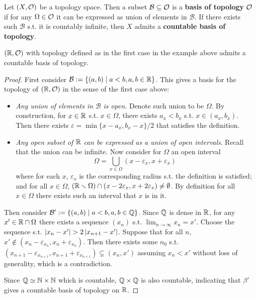 \documentclass{article}
\begin{document}
\begin{definition}
    Let $(X, \mathcal{O})$ be a topology space. Then a subset $\mathcal{B} \subseteq \mathcal{O}$ is a \textbf{basis of topology} $\mathcal{O}$ if for any $\Omega \in \mathcal{O}$ it can be expressed as union of elements in $\mathcal{B}$. If there exists such $\mathcal{B}$ s.t. it is countably infinite, then $X$ admits a \textbf{countable basis of topology}.
\end{definition}

\begin{proposition}
    $(\mathbb{R}, \mathcal{O})$ with topology defined as in the first case in the example above admits a countable basis of topology.
\end{proposition}

\begin{proof}
    First consider $\mathcal{B} := \{(a, b) \mid a < b, a, b \in \mathbb{R}\}$. This gives a basis for the topology of $(\mathbb{R}, \mathcal{O})$ in the sense of the first case above:
    \begin{itemize}
        \item \emph{Any union of elements in $\mathcal{B}$ is open.} Denote such union to be $\Omega$. By construction, for $x \in \mathbb{R}$ s.t. $x \in \Omega$, there exists $a_x < b_x$ s.t. $x \in (a_x, b_x)$. Then there exists $\varepsilon = \min\{x - a_x, b_x - x\} / 2$ that satisfies the definition.
        \item \emph{Any open subset of $\mathbb{R}$ can be expressed as a union of open intervals}. Recall that the union can be infinite. Now consider for $\Omega$ an open interval
        \[
            \Omega = \bigcup_{x \in \Omega} (x - \varepsilon_x, x + \varepsilon_x)
        \]
        where for each $x$, $\varepsilon_x$ is the corresponding radius s.t. the definition is satisfied; and for all $x \in \Omega$, $(\mathbb{R} \smallsetminus \Omega) \cap (x - 2\varepsilon_x, x + 2\varepsilon_x) \neq \emptyset$. By definition for all $x \in \Omega$ there exists such an interval that $x$ is in it.
    \end{itemize}
    Then consider $\mathcal{B}' := \{(a, b) \mid a < b, a, b \in \mathbb{Q}\}$. Since $\mathbb{Q}$ is dense in $\mathbb{R}$, for any $x' \in \mathbb{R} \cap \Omega$ there exists a sequence $(x_n)$ s.t. $\lim_{n \to \infty} x_n = x'$. Choose the sequence s.t. $\left|x_n - x'\right| > 2\left|x_{n+1} - x'\right|$. Suppose that for all $n$, $x' \notin (x_n - \varepsilon_{x_n}, x_n + \varepsilon_{x_n})$. Then there exists some $n_0$ s.t. $(x_{n+1} - \varepsilon_{x_{n+1}}, x_{n+1} + \varepsilon_{x_{n+1}}) \subsetneq (x_n, x')$ assuming $x_n < x'$ without loss of generality, which is a contradiction.

    Since $\mathbb{Q} \simeq \mathbb{N} \times \mathbb{N}$ which is countable, $\mathbb{Q} \times \mathbb{Q}$ is also countable, indicating that $\beta'$ gives a countable basis of topology on $\mathbb{R}$.
\end{proof}
\end{document}
